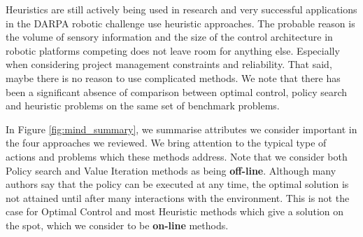 Heuristics are still actively being used in research and very successful applications in the DARPA robotic 
challenge use heuristic approaches. The probable reason is the volume of sensory information 
and the size of the control architecture in robotic platforms competing does not leave room for anything else. Especially  
when considering project management constraints and reliability. That said, maybe there is no reason to use complicated 
methods. We note that there has been a significant absence of comparison between optimal control, policy search 
and heuristic problems on the same set of benchmark problems. 

In Figure \ref{fig:mind_summary}, we summarise attributes we consider important in the four approaches we reviewed.
We bring attention to the typical type of actions and problems which these methods address. Note that we consider both 
Policy search and Value Iteration methods as being \textbf{off-line}. Although many authors say that the policy can be executed 
at any time, the optimal solution is not attained until after many interactions with the environment. This is not the case for 
Optimal Control and most Heuristic methods which give a solution on the spot, which we consider to be 
\textbf{on-line} methods.

